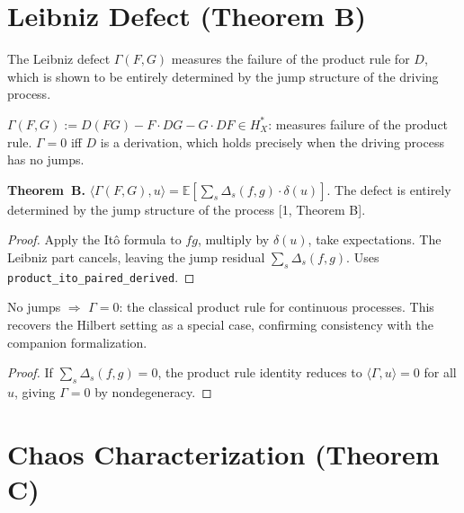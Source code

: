 \section{Leibniz Defect (Theorem B)}

The Leibniz defect $\Gamma(F,G)$ measures the failure of the product rule for $D$, which is shown to be entirely determined by the jump structure of the driving process.

\begin{defn}\label{def:leibniz}
\leanok
{}
$\Gamma(F,G) := D(FG) - F \cdot DG - G \cdot DF \in H_X^*$: measures failure of the product rule.
$\Gamma = 0$ iff $D$ is a derivation, which holds precisely when the driving process has no jumps.
\end{defn}

\begin{theorem}\label{thm:product_rule}
\leanok
{}
\textbf{Theorem~B.}
$\langle \Gamma(F,G), u \rangle = \mathbb{E}[\sum_s \Delta_s(f,g) \cdot \delta(u)]$.
The defect is entirely determined by the jump structure of the process [1, Theorem B].
\end{theorem}
\begin{proof}\leanok Apply the Itô formula to $fg$, multiply by $\delta(u)$, take expectations. The Leibniz part cancels, leaving the jump residual $\sum_s \Delta_s(f,g)$. Uses \texttt{product\_ito\_paired\_derived}.\end{proof}

\begin{theorem}\label{thm:defect_vanishes}
\leanok
{}
No jumps $\Rightarrow$ $\Gamma = 0$: the classical product rule for continuous processes.
This recovers the Hilbert setting as a special case, confirming consistency with the companion formalization.
\end{theorem}
\begin{proof}\leanok If $\sum_s \Delta_s(f,g) = 0$, the product rule identity reduces to $\langle \Gamma, u \rangle = 0$ for all $u$, giving $\Gamma = 0$ by nondegeneracy.\end{proof}

\section{Chaos Characterization (Theorem C)}

